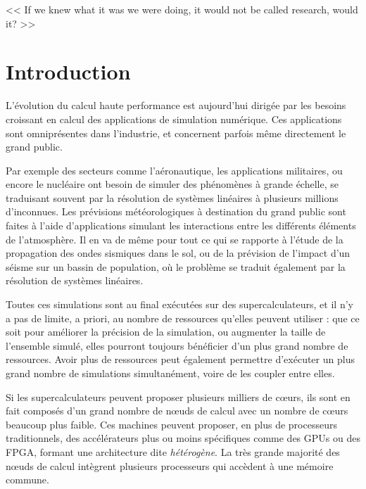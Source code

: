 \begin{savequote}[12cm]
<< If we knew what it was we were doing, it would not be called research, would it? >>


\end{savequote}
\chapter{Introduction}
\chaptertoc

L'évolution du calcul haute performance est aujourd'hui dirigée par les besoins croissant en calcul des applications de simulation numérique.
Ces applications sont omniprésentes dans l'industrie, et concernent parfois même directement le grand public.

Par exemple des secteurs comme l'aéronautique, les applications militaires, ou encore le nucléaire ont besoin de simuler des phénomènes à grande échelle, se traduisant souvent par la résolution de systèmes linéaires à plusieurs millions d'inconnues.
Les prévisions météorologiques à destination du grand public sont faites à l'aide d'applications simulant les interactions entre les différents éléments de l'atmosphère.
Il en va de même pour tout ce qui se rapporte à l'étude de la propagation des ondes sismiques dans le sol, ou de la prévision de l'impact d'un séisme sur un bassin de population, où le problème se traduit également par la résolution de systèmes linéaires.

Toutes ces simulations sont au final exécutées sur des supercalculateurs, et il n'y a pas de limite, a priori, au nombre de ressources qu'elles peuvent utiliser : que ce soit pour améliorer la précision de la simulation, ou augmenter la taille de l'ensemble simulé, elles pourront toujours bénéficier d'un plus grand nombre de ressources.
Avoir plus de ressources peut également permettre d'exécuter un plus grand nombre de simulations simultanément, voire de les coupler entre elles.

Si les supercalculateurs peuvent proposer plusieurs milliers de cœurs, ils sont en fait composés d'un grand nombre de nœuds de calcul avec un nombre de cœurs beaucoup plus faible.
Ces machines peuvent proposer, en plus de processeurs traditionnels, des accélérateurs plus ou moins spécifiques comme des GPUs ou des FPGA, formant une architecture dite \emph{hétérogène}.
La très grande majorité des nœuds de calcul intègrent plusieurs processeurs qui accèdent à une mémoire commune.

